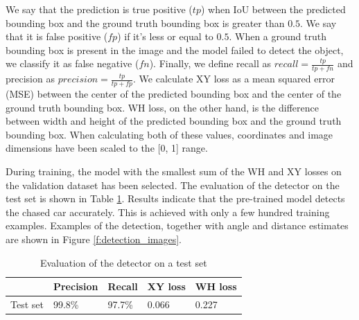 \documentclass{ctuthesis/ctuthesis}
\begin{document}

We say that the prediction is true positive ($tp$) when IoU between the predicted bounding box and the ground truth bounding box is greater than $0.5$. We say that it is false positive ($fp$) if it's less or equal to $0.5$. When a ground truth bounding box is present in the image and the model failed to detect the object, we classify it as false negative ($fn$). Finally, we define recall as $recall=\frac{tp}{tp+fn}$ and precision as $precision=\frac{tp}{tp+fp}$. We calculate XY loss as a mean squared error (MSE) between the center of the predicted bounding box and the center of the ground truth bounding box. WH loss, on the other hand, is the difference between width and height of the predicted bounding box and the ground truth bounding box. When calculating both of these values, coordinates and image dimensions have been scaled to the [0, 1] range. \par

During training, the model with the smallest sum of the WH and XY losses on the validation dataset has been selected. The evaluation of the detector on the test set is shown in Table \ref{tab:detection}. Results indicate that the pre-trained model detects the chased car accurately. This is achieved with only a few hundred training examples. Examples of the detection, together with angle and distance estimates are shown in Figure \ref{f:detection_images}. 

\begin{table}[]
\begin{tabular}{l|llll}
\hline
            & Precision & Recall & XY loss & WH loss \\ \hline
Test set & 99.8\%    & 97.7\% & 0.066   & 0.227   \\ \hline
\end{tabular}
\caption{Evaluation of the detector on a test set}\label{tab:detection}
\end{table}
\end{document}
